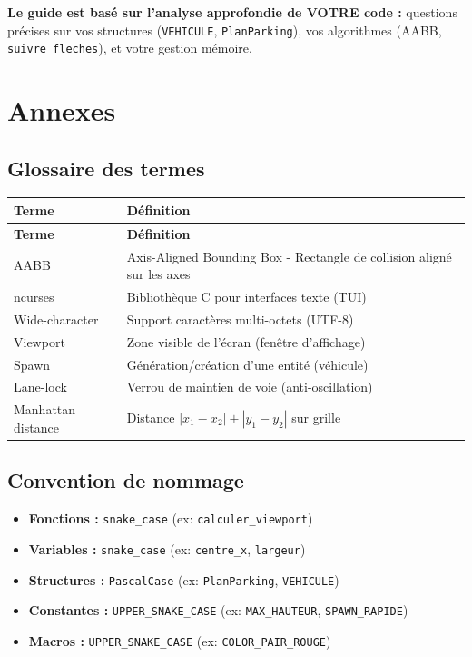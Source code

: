 \documentclass[12pt,a4paper]{article}
\begin{document}
\textbf{Le guide est basé sur l'analyse approfondie de VOTRE code :} questions précises sur vos structures (\texttt{VEHICULE}, \texttt{PlanParking}), vos algorithmes (AABB, \texttt{suivre\_fleches}), et votre gestion mémoire.


\section*{Annexes}

\subsection*{Glossaire des termes}

\begin{longtable}{|p{4cm}|p{10cm}|}
\hline
\textbf{Terme} & \textbf{Définition} \\
\hline
\endfirsthead
\hline
\textbf{Terme} & \textbf{Définition} \\
\hline
\endhead
\hline
\endfoot
AABB & Axis-Aligned Bounding Box - Rectangle de collision aligné sur les axes \\
\hline
ncurses & Bibliothèque C pour interfaces texte (TUI) \\
\hline
Wide-character & Support caractères multi-octets (UTF-8) \\
\hline
Viewport & Zone visible de l'écran (fenêtre d'affichage) \\
\hline
Spawn & Génération/création d'une entité (véhicule) \\
\hline
Lane-lock & Verrou de maintien de voie (anti-oscillation) \\
\hline
Manhattan distance & Distance $|x_1-x_2| + |y_1-y_2|$ sur grille \\
\hline
\end{longtable}

\subsection*{Convention de nommage}

\begin{itemize}
    \item \textbf{Fonctions :} \texttt{snake\_case} (ex: \texttt{calculer\_viewport})
    \item \textbf{Variables :} \texttt{snake\_case} (ex: \texttt{centre\_x}, \texttt{largeur})
    \item \textbf{Structures :} \texttt{PascalCase} (ex: \texttt{PlanParking}, \texttt{VEHICULE})
    \item \textbf{Constantes :} \texttt{UPPER\_SNAKE\_CASE} (ex: \texttt{MAX\_HAUTEUR}, \texttt{SPAWN\_RAPIDE})
    \item \textbf{Macros :} \texttt{UPPER\_SNAKE\_CASE} (ex: \texttt{COLOR\_PAIR\_ROUGE})
\end{itemize}
\end{document}
